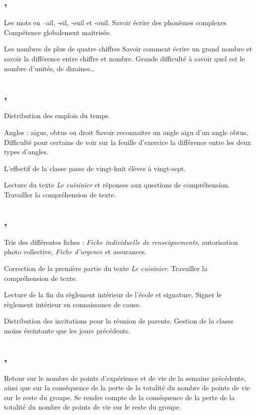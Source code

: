 \documentclass{article}
\begin{document}
\subsection{ \sep}
\ort\ham Les mots en –ail, -eil, -euil et -ouil.
\obj Savoir écrire des phonèmes complexes
\bil Compétence globalement maitrisée.

\nec\hpm Les nombres de plus de quatre chiffres
\obj Savoir comment écrire un grand nombre et savoir la différence entre chiffre et nombre.
\bil Grande difficulté à savoir quel est le nombre d’unités, de dizaines\dots


\subsection{ \sep}
\gdc Distribution des emplois du temps.

\eeg\ham Angles : aigus, obtus ou droit
\obj Savoir reconnaitre un angle aigu d’un angle obtus.
\bil Difficulté pour certains de voir sur la feuille d’exercice la différence entre les deux types d’angles.

\adm{} L’effectif de la classe passe de vingt-huit élèves à vingt-sept.

\lec\hpm Lecture du texte \emph{Le cuisinier} et réponses aux questions de compréhension.
\obj Travailler la compréhension de texte.


\subsection{ \sep}
\adm\ham Trie  des différentes fiches : \textit{Fiche individuelle de renseignements}, autorisation photo collective, \textit{Fiche d’urgence} et assurances.

\lec\amr Correction de la première partie du texte \emph{Le cuisinier}.
\obj Travailler la compréhension de texte.

\emc\hpm Lecture de la fin du règlement intérieur de l’école et signature.
\obj Signer le règlement intérieur en connaissance de cause.

\adm{} Distribution des invitations pour la réunion de parents.
\bil Gestion de la classe moins éreintante que les jours précédents. 


\subsection{ \sep}
\clc\ham Retour sur le nombre de points d’expérience et de vie de la semaine précédente, ainsi que sur la conséquence de la perte de la totalité du nombre de points de vie sur le reste du groupe.
\obj Se rendre compte de la conséquence de la perte de la totalité du nombre de points de vie sur le reste du groupe.
\end{document}
